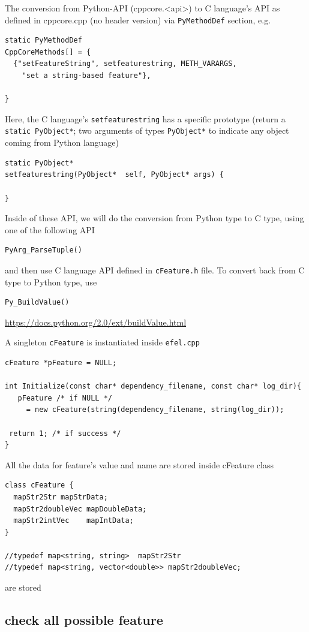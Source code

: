 The conversion from Python-API (cppcore.<api>) to C language's API as
defined in cppcore.cpp (no header version) via \verb!PyMethodDef! section, e.g.
\begin{verbatim}
static PyMethodDef 
CppCoreMethods[] = {
  {"setFeatureString", setfeaturestring, METH_VARARGS,
    "set a string-based feature"},

}
\end{verbatim}
Here, the C language's \verb!setfeaturestring! has a specific prototype (return
a \verb!static PyObject*!; two arguments of types \verb!PyObject*! to indicate
any object coming from Python language)
\begin{verbatim}
static PyObject*  
setfeaturestring(PyObject*  self, PyObject* args) {

}
\end{verbatim}

Inside of these API, we will do the conversion from Python type to C type, using
one of the following API
\begin{verbatim}
PyArg_ParseTuple()
\end{verbatim}
and then use C language API defined in
\verb!cFeature.h! file. To convert back from C type to Python type, use 
\begin{verbatim}
Py_BuildValue()
\end{verbatim}
\url{https://docs.python.org/2.0/ext/buildValue.html}

A singleton \verb!cFeature! is instantiated inside \verb!efel.cpp! 
\begin{verbatim}
cFeature *pFeature = NULL;

int Initialize(const char* dependency_filename, const char* log_dir){
   pFeature /* if NULL */
     = new cFeature(string(dependency_filename, string(log_dir));
     
 return 1; /* if success */
}
\end{verbatim}

All the data for feature's value and name are stored inside cFeature class
\begin{verbatim}
class cFeature {
  mapStr2Str mapStrData;
  mapStr2doubleVec mapDoubleData;
  mapStr2intVec    mapIntData;
}

//typedef map<string, string>  mapStr2Str
//typedef map<string, vector<double>> mapStr2doubleVec;
\end{verbatim}
are stored



\subsection{check all possible feature}
\label{sec:efel-featurenames}

